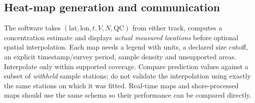 \documentclass[10pt,a4paper]{article}
\begin{document}
\subsection{Heat-map generation and communication}
The software takes $(\mathrm{lat},\mathrm{lon},t,V,N,\mathrm{QC})$ from either track, computes a concentration estimate and displays \emph{actual measured locations} before optional spatial interpolation. Each map needs a legend with units, a declared size cutoff, an explicit timestamp/survey period, sample density and unsupported areas. Interpolate only within supported coverage. Compare prediction values against a subset of \emph{withheld} sample stations; do not validate the interpolation using exactly the same stations on which it was fitted. Real-time maps and shore-processed maps should use the same schema so their performance can be compared directly.

\end{document}
